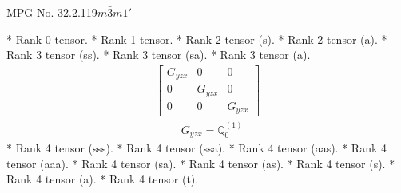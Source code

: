 \documentclass[fleqn,8pt,landscape]{jsarticle}
\begin{document}
\setcounter{MaxMatrixCols}{32}

\renewcommand{\tablename}{Table~}
\renewcommand{\figurename}{Figure~}
\begin{center}
\LARGE
MPG No. 32.2.119\quad$m\bar{3}m1'$
\end{center}
* Rank 0 tensor.
* Rank 1 tensor.
* Rank 2 tensor (s).
* Rank 2 tensor (a).
* Rank 3 tensor (ss).
* Rank 3 tensor (sa).
* Rank 3 tensor (a).
\begin{align*}
\begin{bmatrix} G_{yzx} & 0 & 0 \\ 0 & G_{yzx} & 0 \\ 0 & 0 & G_{yzx} \end{bmatrix}
\end{align*}
\begin{align*}
& G_{yzx} = \mathbb{Q}_{0}^{(1)}
\end{align*}
* Rank 4 tensor (sss).
* Rank 4 tensor (ssa).
* Rank 4 tensor (aas).
* Rank 4 tensor (aaa).
* Rank 4 tensor (sa).
* Rank 4 tensor (as).
* Rank 4 tensor (s).
* Rank 4 tensor (a).
* Rank 4 tensor (t).
\end{document}
